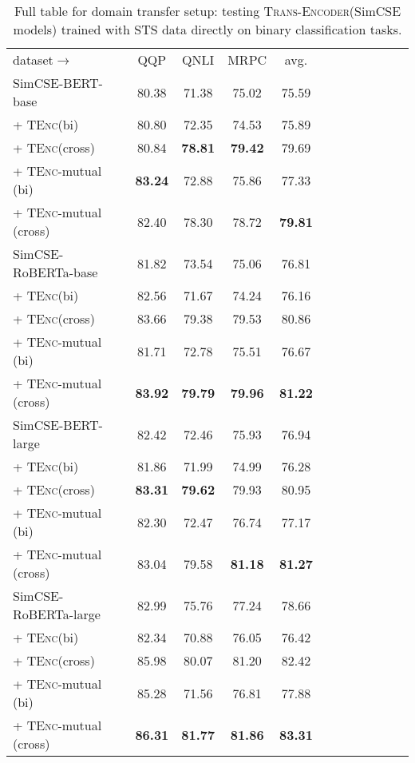 \documentclass{article} \usepackage{iclr2021_conference,times}
\newcommand{\modelname}{\textsc{Trans-Encoder}\xspace}
\newcommand{\tenc}{\textsc{TEnc}\xspace}
\begin{document}
\begin{table}[!t] \setlength{\tabcolsep}{3.6pt}
\centering
\begin{tabular}{lccccccccccc}
\cmidrule[1.5pt]{1-10}
 dataset$\rightarrow$  & QQP & QNLI & MRPC & avg.\\
\cmidrule[1.0pt]{1-10}
  SimCSE-BERT-base & 80.38 & 71.38 & 75.02 & 75.59  \\
  + \tenc (bi) & 80.80 &  72.35 &  74.53 & 75.89 \\
   + \tenc (cross) & 80.84 & \textbf{78.81} & \textbf{79.42} & 79.69 \\
      \rowcolor{blue!5}
   + \tenc-mutual (bi) & \textbf{83.24} &  72.88 & 75.86 & 77.33 \\
      \rowcolor{blue!5}
   + \tenc-mutual (cross) & 82.40 & 78.30 & 78.72 & \textbf{79.81} \\
\hdashline
  SimCSE-RoBERTa-base & 81.82 & 73.54 & 75.06 & 76.81  \\
 + \tenc (bi) & 82.56 & 71.67 & 74.24 & 76.16 \\
   + \tenc (cross) & 83.66 & 79.38 & 79.53 & 80.86 \\
    \rowcolor{blue!5}
  + \tenc-mutual (bi) & 81.71 & 72.78 & 75.51 & 76.67 \\
    \rowcolor{blue!5}
 + \tenc-mutual (cross) & \textbf{83.92} & \textbf{79.79} & \textbf{79.96} & \textbf{81.22} \\
 \cmidrule[.5pt]{1-10}
  SimCSE-BERT-large & 82.42 & 72.46 & 75.93 & 76.94  \\
   + \tenc (bi) & 81.86 & 71.99 & 74.99 & 76.28 \\
   + \tenc (cross) & \textbf{83.31} & \textbf{79.62} & 79.93 & 80.95 \\
    \rowcolor{red!5}
 + \tenc-mutual (bi) & 82.30 & 72.47 & 76.74 & 77.17 \\
  \rowcolor{red!5}
 + \tenc-mutual (cross) & 83.04 & 79.58 & \textbf{81.18} & \textbf{81.27} \\
\hdashline
 SimCSE-RoBERTa-large & 82.99 & 75.76 & 77.24 & 78.66 \\
 + \tenc (bi)  & 82.34 & 70.88 & 76.05 & 76.42 \\
 + \tenc (cross) & 85.98 & 80.07 & 81.20 & 82.42 \\
    \rowcolor{red!5}
 + \tenc-mutual (bi) & 85.28 & 71.56 & 76.81 & 77.88  \\
   \rowcolor{red!5}
 + \tenc-mutual (cross) & \textbf{86.31} &  \textbf{81.77} & \textbf{81.86} & \textbf{83.31} \\
  \cmidrule[1.5pt]{1-10}
\end{tabular}
\caption{Full table for domain transfer setup: testing \modelname (SimCSE models) trained with STS data directly on binary classification tasks. }
\label{tab:binary_transfer_full}
\end{table}
\end{document}
